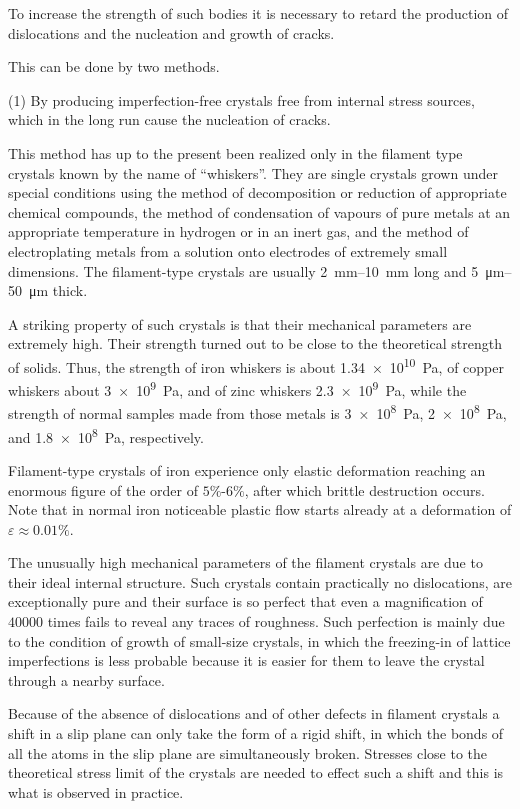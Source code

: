To increase the strength of such bodies it is necessary to retard the production of dislocations and the nucleation and growth of cracks.

This can be done by two methods.

(1) By producing imperfection-free crystals free from internal stress sources, which in the long run cause the nucleation of cracks.

This method has up to the present been realized only in the filament type crystals known by the name of ``whiskers''. They are single crystals grown under special conditions using the method of decomposition or reduction of appropriate chemical compounds, the method of condensation of vapours of pure metals at an appropriate temperature in hydrogen or in an inert gas, and the method of electroplating metals from a solution onto electrodes of extremely small dimensions. The filament-type crystals are usually \SIrange{2}{10}{\milli\metre} long and \SIrange{5}{50}{\micro\metre} thick.

A striking property of such crystals is that their mechanical parameters are extremely high. Their strength turned out to be close to the theoretical strength of solids. Thus, the strength of iron whiskers is about \SI{1.34e10}{\pascal}, of copper whiskers about \SI{3e9}{\pascal}, and of zinc whiskers \SI{2.3e9}{\pascal}, while the strength of normal samples made from those metals is \SI{3e8}{\pascal}, \SI{2e8}{\pascal}, and \SI{1.8e8}{\pascal}, respectively.

Filament-type crystals of iron experience only elastic deformation reaching an enormous figure of the order of $5\%$-$6\%$, after which brittle destruction occurs. Note that in normal iron noticeable plastic flow starts already at a deformation of $\varepsilon\approx 0.01\%$.

The unusually high mechanical parameters of the filament crystals are due to their ideal internal structure. Such crystals contain practically no dislocations, are exceptionally pure and their surface is so perfect that even a magnification of $40000$ times fails to reveal any traces of roughness. Such perfection is mainly due to the condition of growth of small-size crystals, in which the freezing-in of lattice imperfections is less probable because it is easier for them to leave the crystal through a nearby surface.

Because of the absence of dislocations and of other defects in filament crystals a shift in a slip plane can only take the form of a rigid shift, in which the bonds of all the atoms in the slip plane are simultaneously broken. Stresses close to the theoretical stress limit of the crystals are needed to effect such a shift and this is what is observed in practice.

